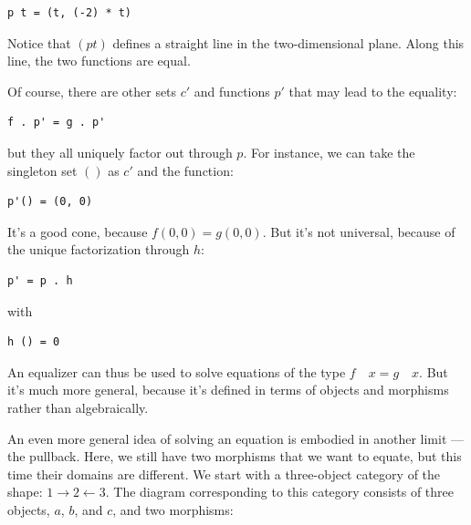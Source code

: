 \begin{Verbatim}
p t = (t, (-2) * t)
\end{Verbatim}

Notice that $(p t)$ defines a straight line in the
two-dimensional plane. Along this line, the two functions are equal.

Of course, there are other sets $c'$ and functions
$p'$ that may lead to the equality:

\begin{Verbatim}
f . p' = g . p'
\end{Verbatim}

but they all uniquely factor out through $p$. For instance, we
can take the singleton set $()$ as $c'$ and the
function:

\begin{Verbatim}
p'() = (0, 0)
\end{Verbatim}

It's a good cone, because $f (0, 0) = g (0, 0)$. But it's
not universal, because of the unique factorization through $h$:

\begin{Verbatim}
p' = p . h
\end{Verbatim}

with

\begin{Verbatim}
h () = 0
\end{Verbatim}

\begin{figure}[H]
\centering
{}
\end{figure}

\noindent
An equalizer can thus be used to solve equations of the type
$f \quad x = g \quad x$. But it's much more general, because it's defined
in terms of objects and morphisms rather than algebraically.

An even more general idea of solving an equation is embodied in another
limit --- the pullback. Here, we still have two morphisms that we want
to equate, but this time their domains are different. We start with a
three-object category of the shape:
$1\rightarrow2\leftarrow3$. The diagram corresponding to
this category consists of three objects, $a$, $b$, and
$c$, and two morphisms:

